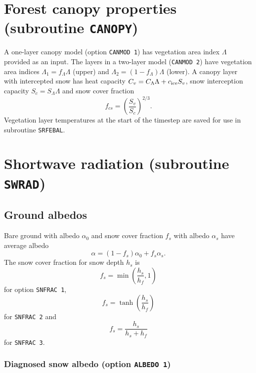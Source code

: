 \documentclass[fleqn]{article}
\begin{document}
\section{Forest canopy properties (subroutine {\tt CANOPY})}

A one-layer canopy model (option {\tt CANMOD 1}) has vegetation area index $\Lambda$ provided as an input. The layers in a two-layer model ({\tt CANMOD 2}) have vegetation area indices $\Lambda_1 = f_\Lambda\Lambda$ (upper) and $\Lambda_2 = (1 - f_\Lambda)\Lambda$ (lower). A canopy layer with intercepted snow has heat capacity $C_v = C_\Lambda\Lambda + c_{\rm ice}S_v$, snow interception capacity $S_c = S_\Lambda\Lambda$ and snow cover fraction
\begin{equation}
f_{cs} = \left(\frac{S_v}{S_c}\right)^{2/3}.
\end{equation}
Vegetation layer temperatures at the start of the timestep are saved for use in subroutine {\tt SRFEBAL}.

\section{Shortwave radiation (subroutine {\tt SWRAD})}

\subsection{Ground albedos}

Bare ground with albedo $\alpha_0$ and snow cover fraction $f_s$ with albedo $\alpha_s$ have average albedo
\begin{equation}
\alpha = (1 - f_s)\alpha_0 +f_s\alpha_s.
\end{equation} 
The snow cover fraction for snow depth $h_s$ is
\begin{equation}
f_s = \min\left(\frac{h_s}{h_f},1\right)
\end{equation}
for option {\tt SNFRAC 1},
\begin{equation}
f_s = \tanh\left(\frac{h_s}{h_f}\right)
\end{equation}
for {\tt SNFRAC 2} and
\begin{equation}
f_s = \frac{h_s}{h_s + h_f}
\end{equation}
for {\tt SNFRAC 3}.

\subsubsection{Diagnosed snow albedo (option {\tt ALBEDO 1})}
\end{document}
